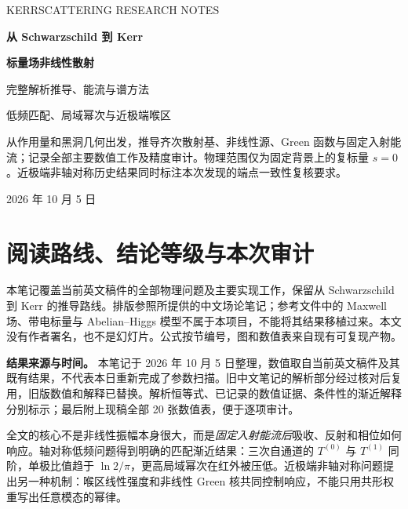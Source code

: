 \documentclass[UTF8,fontset=fandol,11pt,a4paper]{ctexart}
\begin{document}
\begin{titlepage}\centering\vspace*{21mm}
{\small\color{ink} KERRSCATTERING RESEARCH NOTES\par}
\vspace{12mm}
{\Huge\bfseries 从 Schwarzschild 到 Kerr\par}
\vspace{7mm}
{\Huge\bfseries 标量场非线性散射\par}
\vspace{9mm}
{\Large 完整解析推导、能流与谱方法\par}
\vspace{6mm}
{\large 低频匹配、局域幂次与近极端喉区\par}
\vspace{17mm}
\begin{minipage}{0.88\textwidth}\begin{note}
从作用量和黑洞几何出发，推导齐次散射基、非线性源、Green 函数与固定入射能流；记录全部主要数值工作及精度审计。物理范围仅为固定背景上的复标量 $s=0$。近极端非轴对称历史结果同时标注本次发现的端点一致性复核要求。
\end{note}\end{minipage}
\vfill{\large 2026 年 10 月 5 日\par}
\vspace{6mm}{\small 基于当前英文稿件与项目产物整理；不覆盖原稿\par}
\end{titlepage}
\tableofcontents\clearpage{}
\section{阅读路线、结论等级与本次审计}
本笔记覆盖当前英文稿件的全部物理问题及主要实现工作，保留从 Schwarzschild 到 Kerr 的推导路线。排版参照所提供的中文场论笔记；参考文件中的 Maxwell 场、带电标量与 Abelian--Higgs 模型不属于本项目，不能将其结果移植过来。本文没有作者署名，也不是幻灯片。公式按节编号，图和数值表来自现有可复现产物。

\begin{note}
\textbf{结果来源与时间。} 本笔记于 2026 年 10 月 5 日整理，数值取自当前英文稿件及其既有结果，不代表本日重新完成了参数扫描。旧中文笔记的解析部分经过核对后复用，旧版数值和解释已替换。解析恒等式、已记录的数值证据、条件性的渐近解释分别标示；最后附上现稿全部 20 张数值表，便于逐项审计。
\end{note}

全文的核心不是非线性振幅本身很大，而是\emph{固定入射能流后}吸收、反射和相位如何响应。轴对称低频问题得到明确的匹配渐近结果：三次自通道的 $T^{(0)}$ 与 $T^{(1)}$ 同阶，单极比值趋于 $\ln2/\pi$，更高局域幂次在红外被压低。近极端非轴对称问题提出另一种机制：喉区线性强度和非线性 Green 核共同控制响应，不能只用共形权重写出任意模态的幂律。
\end{document}
